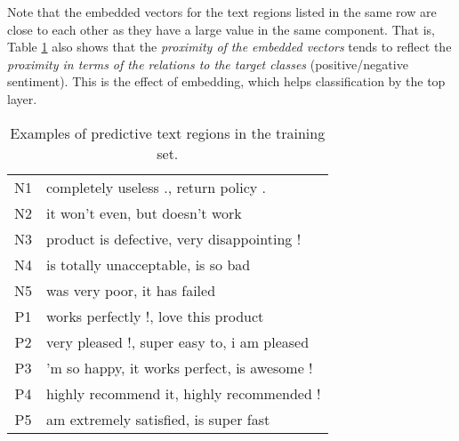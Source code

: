 \documentclass[11pt,letterpaper]{article}
\begin{document}
Note that the embedded vectors for the text regions listed in the same row 
are close to each other as they have a large value in the same component. 
That is, Table \ref{tab:bv} also shows that
the {\em proximity of the embedded vectors} tends to reflect the {\em proximity  
in terms of the relations to the target classes} (positive/negative sentiment). 
This is the effect of embedding, which helps classification by the top layer.  



\begin{table}
\begin{center}
\begin{footnotesize}
\begin{tabular}{|c|p{2.5in}|} 
\hline
{\small N1} & {\small completely useless ., return policy .} \\
{\small N2} & {\small it won't even, but doesn't work} \\
{\small N3} & {\small product is defective, very disappointing !} \\
{\small N4} & {\small is totally unacceptable, is so bad} \\
{\small N5} & {\small was very poor, it has failed} \\
\hline
{\small P1} & {\small works perfectly !, love this product} \\
{\small P2} & {\small very pleased !, super easy to, i am pleased} \\
{\small P3} & {\small 'm so happy, it works perfect, is awesome !} \\
{\small P4} & {\small highly recommend it, highly recommended !} \\  {\small P5} & {\small am extremely satisfied, is super fast} \\
\hline
\end{tabular}
\end{footnotesize}
\vspace{-0.1in}
\caption{ \label{tab:bv} \small
Examples of predictive text regions in the training set. 
}
\end{center}
\end{table}
\end{document}
